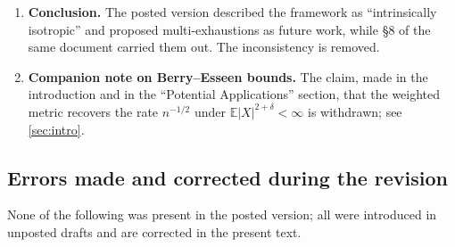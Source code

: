 \documentclass[11pt,a4paper]{article}
\numberwithin{equation}{section}
\theoremstyle{plain}
\theoremstyle{definition}
\theoremstyle{remark}
\begin{document}
\begin{enumerate}
\item \textbf{Conclusion.} The posted version described the framework as ``intrinsically
isotropic'' and proposed multi-exhaustions as future work, while \S8 of the same document
carried them out. The inconsistency is removed.

\item \textbf{Companion note on Berry--Esseen bounds.} The claim, made in the
introduction and in the ``Potential Applications'' section, that the weighted metric
recovers the rate $n^{-1/2}$ under $\mathbb{E}|X|^{2+\delta}<\infty$ is withdrawn; see
\cref{sec:intro}.

\end{enumerate}

\subsection{Errors made and corrected during the revision}
\label{app:part-revision}

None of the following was present in the posted version; all were introduced in unposted
drafts and are corrected in the present text.
\end{document}
